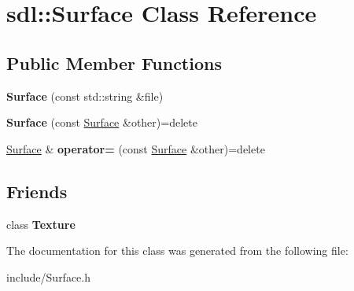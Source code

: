 \hypertarget{classsdl_1_1Surface}{\section{sdl\-:\-:Surface Class Reference}
\label{classsdl_1_1Surface}
}
\subsection*{Public Member Functions}
\begin{DoxyCompactItemize}
\item 
\hypertarget{classsdl_1_1Surface_ad6cafa1f2ab6a1979cd35dcfb040befa}{{\bfseries Surface} (const std\-::string \&file)}\label{classsdl_1_1Surface_ad6cafa1f2ab6a1979cd35dcfb040befa}

\item 
\hypertarget{classsdl_1_1Surface_a9e6ae2a781680e9acefe8cf72ebe6fc9}{{\bfseries Surface} (const \hyperlink{classsdl_1_1Surface}{Surface} \&other)=delete}\label{classsdl_1_1Surface_a9e6ae2a781680e9acefe8cf72ebe6fc9}

\item 
\hypertarget{classsdl_1_1Surface_a316b3db70ebb93584204658fbc715996}{\hyperlink{classsdl_1_1Surface}{Surface} \& {\bfseries operator=} (const \hyperlink{classsdl_1_1Surface}{Surface} \&other)=delete}\label{classsdl_1_1Surface_a316b3db70ebb93584204658fbc715996}

\end{DoxyCompactItemize}
\subsection*{Friends}
\begin{DoxyCompactItemize}
\item 
\hypertarget{classsdl_1_1Surface_af7f909106d08e36cd50aa58e36f9bf47}{class {\bfseries Texture}}\label{classsdl_1_1Surface_af7f909106d08e36cd50aa58e36f9bf47}

\end{DoxyCompactItemize}


The documentation for this class was generated from the following file\-:\begin{DoxyCompactItemize}
\item 
include/Surface.\-h\end{DoxyCompactItemize}
